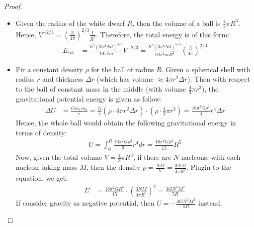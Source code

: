 \documentclass{article}
\begin{document}
\begin{proof}

    \hfil

    \begin{itemize}
        \item[(a)] Given the radius of the white dwarf $R$, then the volume of a ball is $\frac{4}{3}\pi R^3$. Hence, $V^{-2/3} = \left(\frac{3}{4\pi}\right)^{2/3}\frac{1}{R^2}$. Therefore, the total energy is of this form:
        \begin{align}
            E_\text{tot} &= \frac{\hbar^2(3\pi^2 Nd)^{5/3}}{10\pi^2 m}V^{-2/3} = \frac{\hbar^2(3\pi^2 Nd)^{5/3}}{10\pi^2 m R^2}\left(\frac{3}{4\pi}\right)^{2/3}
        \end{align}

        \hfil

        \item[(b)] Fir a constant density $\rho$ for the ball of radius $R$. Given a spherical shell with radius $r$ and thickness $\Delta r$ (which has volume $\approx 4\pi r^2\Delta r$). Then with respect to the ball of constant mass in the middle (with volume $\frac{4}{3}\pi r^3$), the gravitational potential energy is given as follow:
        \begin{align}
            \Delta U &= \frac{G m_1 m_2}{r} = \frac{G}{r}\left(\rho\cdot 4\pi r^2\Delta r\right)\cdot\left(\rho \cdot \frac{4}{3}\pi r^3\right) = \frac{16\pi^2G\rho^2}{3}r^4\Delta r
        \end{align}
        Hence, the whole ball would obtain the following gravitational energy in terms of density:
        \begin{align}
            U = \int_{0}^{R}\frac{16\pi^2 G\rho^2}{3}r^4 dr = \frac{16\pi^2 G\rho^2}{15}R^5
        \end{align}
        Now, given the total volume $V=\frac{4}{3}\pi R^3$, if there are $N$ nucleons, with each nucleon taking mass $M$, then the density $\rho = \frac{N M}{V} = \frac{3N M}{4\pi R^3}$. Plugin to the equation, we get:
        \begin{align}
            U &= \frac{16\pi^2 G R^5}{15}\cdot \left(\frac{3N M}{4\pi R^3}\right)^2 = \frac{3 G N^2 M^2}{5R}
        \end{align}
        If consider gravity as negative potential, then $U = -\frac{3GN^2M^2}{5R}$ instead.
    \end{itemize}

    \hfil


\end{proof}
\end{document}
